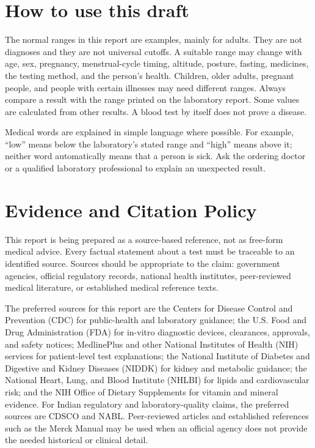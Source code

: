 \documentclass[11pt,openany]{book}
\begin{document}
\section{How to use this draft}
The normal ranges in this report are examples, mainly for adults. They are not
diagnoses and they are not universal cutoffs. A suitable range may change with
age, sex, pregnancy, menstrual-cycle timing, altitude, posture, fasting,
medicines, the testing method, and the person's health. Children, older adults,
pregnant people, and people with certain illnesses may need different ranges.
Always compare a result with the range printed on the laboratory report. Some
values are calculated from other results. A blood test by itself does not prove
a disease.

Medical words are explained in simple language where possible. For example,
``low'' means below the laboratory's stated range and ``high'' means above it;
neither word automatically means that a person is sick. Ask the ordering doctor
or a qualified laboratory professional to explain an unexpected result.

\section{Evidence and Citation Policy}

This report is being prepared as a source-based reference, not as free-form
medical advice. Every factual statement about a test must be traceable to an
identified source. Sources should be appropriate to the claim: government
agencies, official regulatory records, national health institutes,
peer-reviewed medical literature, or established medical reference texts.

The preferred sources for this report are the Centers for Disease Control and
Prevention (CDC) for public-health and laboratory guidance; the U.S. Food and
Drug Administration (FDA) for in-vitro diagnostic devices, clearances,
approvals, and safety notices; MedlinePlus and other National Institutes of
Health (NIH) services for patient-level test explanations; the National
Institute of Diabetes and Digestive and Kidney Diseases (NIDDK) for kidney and
metabolic guidance; the National Heart, Lung, and Blood Institute (NHLBI) for
lipids and cardiovascular risk; and the NIH Office of Dietary Supplements for
vitamin and mineral evidence. For Indian regulatory and laboratory-quality
claims, the preferred sources are CDSCO and NABL. Peer-reviewed articles and
established references such as the Merck Manual may be used when an official
agency does not provide the needed historical or clinical detail.
\end{document}
